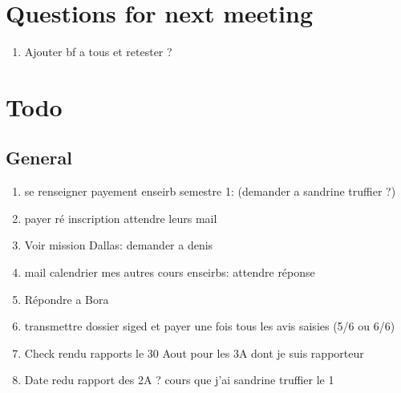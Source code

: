 \documentclass[a4paper]{article}
\begin{document}
\section{Questions for next meeting}
	\begin{enumerate}
		\item Ajouter bf a tous et retester ?
	\end{enumerate}
	
\section{Todo}
	\subsection{General}
		\begin{enumerate}
			\item se renseigner payement enseirb semestre 1: (demander a sandrine truffier ?)
			\item payer ré inscription attendre leurs mail
			\item Voir mission Dallas: demander a denis
			\item mail calendrier mes autres cours enseirbs: attendre réponse
			\item Répondre a Bora
			\item transmettre dossier siged  et payer une fois tous les avis saisies (5/6 ou 6/6)
			\item Check rendu rapports le 30 Aout pour les 3A dont je suis rapporteur
			\item Date redu rapport des 2A ?
			\mail cours que j'ai sandrine truffier le 1
		\end{enumerate}
\end{document}
